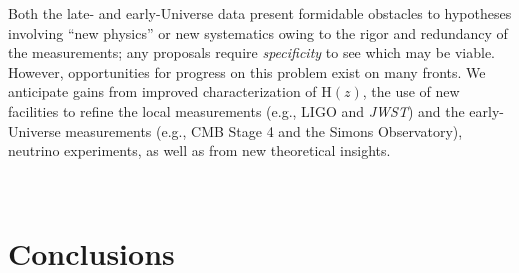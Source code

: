 \documentclass[12pt]{aastex631}
\begin{document}
Both the late- and early-Universe data present formidable obstacles to hypotheses involving ``new physics'' or new systematics owing to the rigor and redundancy of the measurements; any proposals require {\it specificity} to see which may be viable. However, opportunities for progress on this problem exist on many fronts. We anticipate gains from improved characterization of H$(z)$, the use of new facilities to refine the local measurements (e.g., LIGO and {\it JWST}) and the early-Universe measurements (e.g., CMB Stage 4 and the Simons Observatory), neutrino experiments, as well as from new theoretical insights.

\ \par

\section{Conclusions\label{sc:8}}    
 
\end{document}
